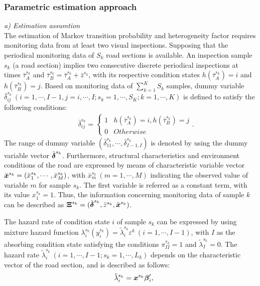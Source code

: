 \subsubsection{Parametric estimation approach}
\label{6441}
\textit{a) Estimation assumtion}\\
The estimation of Markov transition probability and heterogeneity factor requires monitoring data from at least two visual inspections. Supposing that the periodical monitoring data of $S_k$ road sections is available. An inspection sample $s_k$ (a road section) implies two consecutive discrete periodical inspections at times $\bar{\tau}_A^{s_k}$ and $\bar{\tau}_B^{s_k}=\bar{\tau}_A^{s_k}+\bar{z}^{s_k}$, with its respective condition states $h(\bar{\tau}_A^{s_k})=i$ and $h(\bar{\tau}_B^{s_k})=j$. Based on monitoring data of $\sum_{k=1} ^K S_k$ samples, dummy variable $\bar{\delta}_{ij}^{s_k} ~ (i=1,\cdots,I-1,j=i,\cdots,I;s_k=1,\cdots,S_K;k=1,\cdots,K) $ is defined to satisfy the following conditions: 
%
 \begin{eqnarray}
      && \bar{\delta}_{ij}^{s_k}=\left\{
      \begin{array}{ll}
         1 &  h(\bar{\tau}_A^{s_k})=i,h(\bar{\tau}_B^{s_k})=j\\
         0 & Otherwise 
      \end{array}.
      \right.
   \end{eqnarray}
%
The range of dummy variable $(\bar{\delta}_{11}^{s_k},\cdots,\bar{\delta}_{I-1,I}^{s_k})$ is denoted by using the dummy variable vector $\bar{\mbox{\boldmath$\delta$}}^{s_k}$. Furthermore, structural characteristics and environment conditions of the road are expressed by means of characteristic variable vector $\bar{\mbox{\boldmath$x$}}^{s_k}=(\bar{x}_1^{s_k},\cdots,\bar{x}_M^{s_k})$, with $\bar{x}_m^{s_k}~(m=1,\cdots,M)$ indicating the observed value of variable $m$ for sample ${s_k}$. The first variable is referred as a constant term, with its value $x_1^{s_k}=1$. Thus, the information concerning monitoring data of sample $k$ can be described as $\mbox{\boldmath$\Xi$}^{s_k}=(\bar{\mbox{\boldmath$\delta$}}^{s_k},\bar{z}^{s_k},\bar{\mbox{\boldmath$x$}}^{s_k})$.

The hazard rate of condition state $i$ of sample $s_k$ can be expressed by using mixture hazard function $\lambda_i^{s_k}(y_i^{s_k})=\tilde{\lambda}_i^{s_k}\varepsilon^k ~(i=1,\cdots,I-1)$, with $I$ as the absorbing condition state satisfying the conditions $\pi_{II}^{s_k}=1$ and $\tilde{\lambda}_I^{s_k}=0$. The hazard rate $\tilde{\lambda}_i^{s_k}~(i=1,\cdots,I-1;{s_k}=1,\cdots,L_k)$ depends on the characteristic vector of the road section, and is described as follows: 
%
\begin{eqnarray}
      && \tilde{\lambda}_i^{s_k}=\mbox{\boldmath$x$}^{s_k}\mbox{\boldmath$\beta$}_i^\prime,
      \label{hazard14}
\end{eqnarray}


